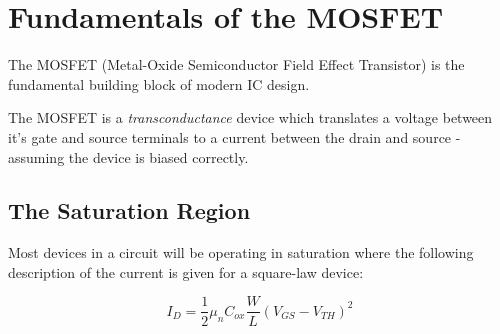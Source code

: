 \documentclass[11pt]{article}
\begin{document}

\maketitle %

\thispagestyle{empty} %

\newpage


\section{Fundamentals of the MOSFET}

The MOSFET (Metal-Oxide Semiconductor Field Effect Transistor) is the fundamental building block of modern IC design.

\begin{figure}[h]
\end{figure}

The MOSFET is a \textit{transconductance} device which translates a voltage between it's gate and source terminals to a current between the drain and source - assuming the device is biased correctly.

\subsection{The Saturation Region}

Most devices in a circuit will be operating in saturation where the following description of the current is given for a square-law device:

\begin{equation}
I_D = \frac{1}{2} \mu_n C_{ox} \frac{W}{L} {\left( V_{GS} - V_{TH} \right)}^2
\end{equation}
\end{document}
